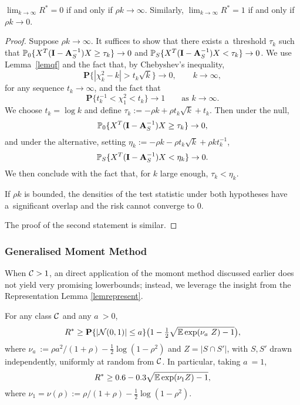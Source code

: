 \documentclass[10pt, oneside]{article}
\begin{document}
\begin{prop}
  $\lim_{k\to\infty}R^*= 0$ if and only if $\rho k \to\infty$. Similarly, $\lim_{k\to\infty}R^*= 1$ if and only if $\rho k \to0$.
\end{prop}
\begin{proof}
  Suppose $\rho k \to\infty$.
  It suffices to show that there exists a~threshold $\tau_k$ such that
  $\mathbb{P}_0\{X^T (\mathbf{I}- \mathbf{A}_S^{-1}) X\ge\tau_k\} \to0$
  and $\mathbb{P}_S\{X^T (\mathbf{I}- \mathbf{A}_S^{-1}) X< \tau_k\} \to0$.
  We use Lemma~\ref{lemqf} and the fact that, by Chebyshev's inequality,
  \[
  \mathbf{P}\bigl\{|\chi_{k}^2 - k| > t_k \sqrt{k}\bigr\} \to0, \qquad
  k \to \infty,
  \]
  for any sequence $t_k \to\infty$, and the fact that
  \[
  \mathbf{P}\{t_k^{-1} < \chi_1^2 < t_k\} \to1  \qquad\mbox{as $k \to
  \infty$}.
  \]
  We choose $t_k = \log k$ and define $\tau_k := -\rho k + \rho t_k
  \sqrt{k} + t_k$.
  Then under the null,
  \[
  \mathbb{P}_0\{X^T (\mathbf{I}- \mathbf{A}_S^{-1}) X \ge\tau_k \} \to0,
  \]
  and under the alternative, setting $\eta_k := -\rho k - \rho t_k \sqrt
  {k} + \rho k t_k^{-1}$,
  \[
  \mathbb{P}_S\{X^T (\mathbf{I}- \mathbf{A}_S^{-1}) X < \eta_k \} \to0.
  \]
  We then conclude with the fact that, for $k$ large enough, $\tau_k <
  \eta_k$.
  
  If $\rho k$ is bounded, the densities of the test statistic under
  both hypotheses have a~significant overlap and the risk cannot
  converge to $0$.
  
  The proof of the second statement is similar.
\end{proof}

\subsubsection{Generalised Moment Method}
When ${\mathcal C} > 1$, an direct application of the momont method discussed earlier does not yield very promising lowerbounds; instead, we leverage the insight from the Representation Lemma \ref{lemrepresent}.
\begin{prop}
  \label{thmlower}
For any class ${\mathcal C}$ and any $a~> 0$,
\[
R^* \geq\mathbf{P}\{|{\mathcal N}(0,1)| \le a\} \bigl(1 - \tfrac12 \sqrt{\mathbb{E}
\exp
(\nu_a~Z ) - 1}\bigr),
\]
where $\nu_a~:= \rho a^2/(1+\rho)- \frac12 \log(1-\rho^2)$ and
$Z=|S \cap S'|$, with $S, S'$ drawn independently, uniformly at random
from ${\mathcal C}$. In particular, taking $a~= 1$,
\[
R^* \geq0.6 - 0.3 \sqrt{\mathbb{E}\exp(\nu_1 Z ) - 1},
\]
where $\nu_1 = \nu(\rho) := \rho/(1+\rho)- \frac12 \log(1-\rho^2)$.
\end{prop}
\end{document}
